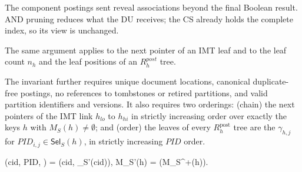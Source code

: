 The component postings sent reveal associations beyond the final Boolean result. AND pruning reduces
what the DU receives; the CS already holds the complete index, so its view is unchanged.



The same argument applies to the next pointer of an IMT leaf and to the leaf count $n_h$ and the leaf
positions of an $R^{post}_h$ tree.



The invariant further requires unique document locations, canonical duplicate-free postings, no
references to tombstones or retired partitions, and valid partition identifiers and versions. It also
requires two orderings: (chain) the next pointers of the IMT link $h_{lo}$ to $h_{hi}$ in strictly
increasing order over exactly the keys $h$ with $M_S(h) \ne \emptyset$; and (order) the leaves of every
$R^{\mathrm{post}}_h$ tree are the $\gamma_{h,j}$ for $PID_{i,j} \in \mathsf{Sel}_S(h)$, in strictly
increasing $PID$ order.


\mu(cid, PID, \ell) = \big(cid, _{S'}(cid)\big), \qquad
M_{S'}(h) = \mu\big(M_{S^{+}}(h)\big).


